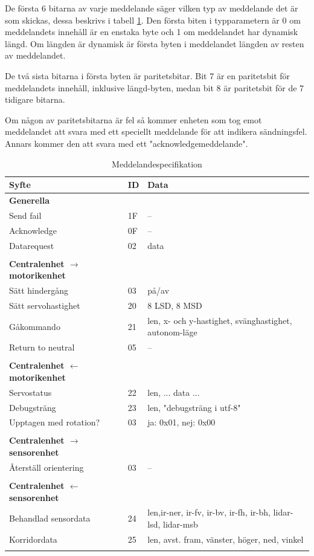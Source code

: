 \documentclass[a4paper,titlepage,12pt]{article}
\begin{document}
	De första 6 bitarna av varje meddelande säger vilken typ av meddelande det är som
	skickas, dessa beskrivs i tabell 
	\ref{table:messages}. Den första biten i typparametern är 0 om meddelandets
	innehåll är en enstaka byte och 1 om meddelandet har dynamisk längd. Om längden
	är dynamisk är första byten i meddelandet längden av resten av meddelandet.

	De två sista bitarna i första byten är paritetsbitar. Bit 7 är en  paritetsbit
	för meddelandets innehåll, inklusive längd-byten, medan bit 8 är paritetsbit för de 7 tidigare bitarna.

	Om någon av paritetsbitarna är fel så kommer enheten som tog emot meddelandet att svara
	med ett speciellt meddelande för att indikera sändningsfel. Annars kommer den 
	att svara med ett "acknowledgemeddelande".

    \newpage
	\begin{longtable}[c]{ l l l }
		\textbf{Syfte} & \textbf{ID} & \textbf{Data} \\ \midrule
		\textbf{Generella} \\ \midrule
		Send fail & 1F & -- \\ \midrule
		Acknowledge & 0F & -- \\ \midrule
		Datarequest & 02 & data \\ \midrule
		\\
		\textbf{Centralenhet $ \to $ motorikenhet}\\ \midrule
		Sätt hindergång & 03 & på/av \\ \midrule
		Sätt servohastighet & 20 & 8 LSD, 8 MSD \\ \midrule
		Gåkommando &  21 & len, x- och y-hastighet, svänghastighet,
        autonom-läge \\ \midrule
		Return to neutral & 05 & -- \\ \midrule
		\\
		\textbf{Centralenhet $ \gets $ motorikenhet}\\ \midrule
		Servostatus & 22 & len, ... data ... \\ \midrule
		Debugsträng & 23 & len, "debugsträng i utf-8" \\ \midrule
		Upptagen med rotation? & 03 & ja: 0x01, nej: 0x00 \\ \midrule
		\\
		\textbf{Centralenhet $\to$ sensorenhet} \\ \midrule
		Återställ orientering & 03 & -- \\ \midrule
		\\
		\textbf{Centralenhet $ \gets $ sensorenhet}\\ \midrule
		Behandlad sensordata & 24 & len,ir-ner, ir-fv, ir-bv, ir-fh, ir-bh,
        lidar-lsd, lidar-msb \\ \midrule
		Korridordata		 & 25 & len, avst. fram, vänster, höger, ned, vinkel \\

		\caption{Meddelandespecifikation \label{table:messages}}
	\end{longtable}
    
\end{document}
